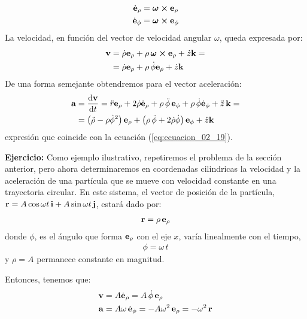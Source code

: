\begin{align}
\dot{\vb{e}}_{\rho} &= \bm{\omega} \cp \vb{e}_{\rho} \label{eq:ecuacion_02_23} \\
\dot{\vb{e}}_{\phi} &= \bm{\omega} \cp \vb{e}_{\phi} \label{eq:ecuacion_02_24}
\end{align}
La velocidad, en función del vector de velocidad angular $\omega$, queda expresada por:
\begin{align}
\begin{aligned}
\vb{v} &= \dot{\rho} \vb{e}_{\rho} + \rho \, \bm{\omega} \cp \vb{e}_{\rho} + \dot{z} \vb{k} = \\
&= \dot{\rho} \vb{e}_{\rho} + \rho \, \dot{\phi} \vb{e}_{\rho} + \dot{z} \vb{k}
\end{aligned}
\label{eq:ecuacion_02_25}
\end{align}
De una forma semejante obtendremos para el vector aceleración:
\begin{align}
\begin{aligned}
\vb{a} &= \dv{\vb{v}}{t} = \ddot{r} \vb{e}_{\rho} + 2 \dot{\rho} \dot{\vb{e}}_{\rho} + \rho \, \ddot{\phi} \, \vb{e}_{\phi} + \rho \, \dot{\phi} \dot{\vb{e}}_{\phi} + \ddot{z} \, \vb{k} = \\
&= \left( \ddot{\rho} - \rho \dot{\phi}^{2} \right) \vb{e}_{\rho} + \left( \rho \, \ddot{\phi} + 2 \dot{\rho} \dot{\phi} \right) \vb{e}_{\phi} + \ddot{z} \vb{k}
\end{aligned}
\label{eq:ecuacion_02_26}
\end{align}
expresión que coincide con la ecuación (\ref{eq:ecuacion_02_19}).
\par
\noindent
\textbf{Ejercicio: } Como ejemplo ilustrativo, repetiremos el problema de la sección anterior, pero ahora determinaremos en coordenadas cilindricas la velocidad y la aceleración de una partícula que se mueve con velocidad constante en una trayectoria circular. En este sistema, el vector de posición de la partícula, 
$\vb{r} = A \cos \omega t \, \vb{i} +  A \sin \omega t \, \vb{j}$, estará dado por:
\begin{align}
\vb{r} = \rho \, \vb{e}_{\rho}
\label{eq:ecuacion_02_27}
\end{align}
donde $\phi$, es el ángulo que forma $\vb{e}_{\rho}$ con el eje $x$, varía linealmente con el tiempo, 
\begin{align*}
\phi = \omega \, t
\end{align*}
y $\rho = A$ permanece constante en magnitud. 
\par
Entonces, tenemos que:
\begin{align}
\vb{v} &= A \dot{\vb{e}}_{\rho} = A \, \dot{\phi} \, \vb{e}_{\rho} \label{eq:ecuacion_02_28} \\
\vb{a} &= A \omega \, \dot{\vb{e}}_{\phi} = - A \omega^{2} \, \vb{e}_{\rho} = - \omega^{2} \, \vb{r} \label{eq:ecuacion_02_29}
\end{align}
